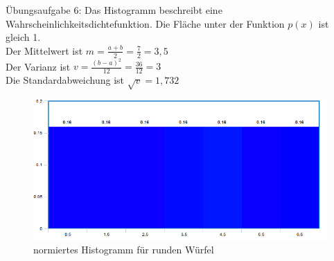 

	Übungsaufgabe 6: \newline
	Das Histogramm beschreibt eine Wahrscheinlichkeitsdichtefunktion. Die Fl\"ache unter der Funktion $p(x)$ ist gleich 1. \\
	Der Mittelwert ist $m = \frac{a+b}{2} = \frac{7}{2} = 3,5$ \\
	Der Varianz ist $v = \frac{(b-a)^2}{12} = \frac{36}{12} = 3 $ \\
	Die Standardabweichung ist $\sqrt{v} = 1,732$
	\begin{figure}
		\includegraphics[width=1.0\textwidth]{A06_Histo.png}
		\caption{normiertes Histogramm f\"ur runden W\"urfel}
	\end{figure}
	
